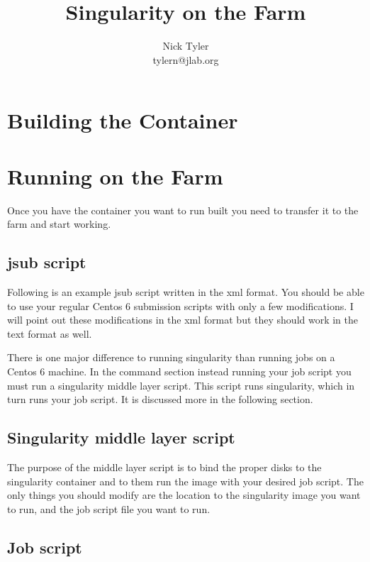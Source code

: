 \documentclass[12pt]{report}
\title{Singularity on the Farm}
\author{Nick Tyler \\ tylern@jlab.org}
\begin{document}
\maketitle
\section*{Building the Container}
\pagebreak


\section*{Running on the Farm}
Once you have the container you want to run built you need to transfer it to the farm and start working.

\subsection*{jsub script}
\quad Following is an example jsub script written in the xml format. You should be able to use your regular Centos 6 submission scripts with only a few modifications. I will point out these modifications in the xml format but they should work in the text format as well.


There is one major difference to running singularity than running jobs on a Centos 6 machine. In the command section instead running your job script you must run a singularity middle layer script. This script runs singularity, which in turn runs your job script. It is discussed more in the following section.


\subsection*{Singularity middle layer script}
\quad The purpose of the middle layer script is to bind the proper disks to the singularity container and to them run the image with your desired job script. The only things you should modify are the location to the singularity image you want to run, and the job script file you want to run.



\subsection*{Job script}
\end{document}
